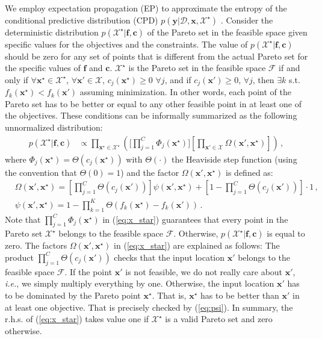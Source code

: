\documentclass[review,preprint,12pt]{elsarticle}
\begin{document}
We employ expectation propagation (EP) to approximate the entropy of the 
conditional predictive distribution (CPD) $p(\textbf{y}|\mathcal{D}, \textbf{x}, \mathcal{X}^{\star})$ 
\citep{minka2001expectation}. Consider the deterministic distribution 
$p(\mathcal{X}^{\star}|\textbf{f},\textbf{c})$ of the Pareto set 
in the feasible space given specific values for the objectives and the constraints. 
The value of $p(\mathcal{X}^{\star}|\textbf{f},\textbf{c})$ should be zero for 
any set of points that is different from the actual Pareto set for the specific values of 
$\mathbf{f}$ and $\mathbf{c}$.  $\mathcal{X}^{\star}$ is the Pareto set in the feasible space $\mathcal{F}$ if and only if 
$\forall \mathbf{x}^{\star} \in \mathcal{X}^{\star}$, $\forall \textbf{x}'\in\mathcal{X}$, $c_j(\mathbf{x}^\star) \geq 0$ 
$\forall j$, and if $c_j(\textbf{x}') \geq 0$, $\forall j$, then 
$\exists k$ s.t. $f_k(\mathbf{x}^{\star}) < f_k(\textbf{x}')$ assuming minimization. 
In other words, each point of the Pareto set has to be better or equal to any 
other feasible point in at least one of the objectives. 
These conditions can be informally summarized as the following unnormalized distribution:
\begin{align}
p(\mathcal{X}^{\star}|\textbf{f},\textbf{c}) & \propto 
	\prod_{\textbf{x}^\star\in \mathcal{X}^\star} 
	\left(
	\Bigg[\prod_{j=1}^{C}\Phi_j(\textbf{x}^{\star})\Bigg]
	\left[ 
	\prod_{\textbf{x}'\in \mathcal{X}} 
	\Omega(\textbf{x}',\textbf{x}^{\star})
	\right]	
	\right)
	\,,
	\label{eq:x_star}
\end{align}
where $\Phi_j(\mathbf{x}^\star) = \Theta(c_j(\mathbf{x}^\star))$ with
$\Theta(\cdot)$ the Heaviside step function (using the convention that $\Theta(0)=1$) 
and the factor $\Omega(\textbf{x}',\textbf{x}^{\star})$ is defined as:
\begin{align}
& \Omega(\textbf{x}',\textbf{x}^{\star})  = \left[\prod_{j=1}^{C}\Theta(c_j(\mathbf{x}'))\right] 
\psi(\textbf{x}',\textbf{x}^{\star}) + \left[1 - \prod_{j=1}^{C}\Theta(c_j(\textbf{x}')) \right] \cdot 1\,,\\
& \psi(\textbf{x}',\textbf{x}^{\star}) = 1 - \prod_{k=1}^K \Theta (f_k(\textbf{x}^{\star})-f_k(\textbf{x}'))\,.
\label{eq:psi}
\end{align}
Note that $\prod_{j=1}^{C}\Phi_j(\textbf{x}^{\star})$ in (\ref{eq:x_star}) guarantees that every 
point in the Pareto set $\mathcal{X}^\star$ belongs to the feasible space $\mathcal{F}$. 
Otherwise, $p(\mathcal{X}^\star |\mathbf{f},\mathbf{c})$ is equal to zero.
The factors $\Omega(\mathbf{x}',\mathbf{x}^\star)$ in (\ref{eq:x_star}) are explained as follows:
The product $\prod_{j=1}^{C}\Theta(c_j(\textbf{x}'))$ checks that the input location $\mathbf{x}'$
belongs to the feasible space $\mathcal{F}$. 
If the point $\mathbf{x}'$ is not feasible, we do not really care about $\mathbf{x}'$, \emph{i.e.}, we simply 
multiply everything by one. Otherwise, the input location $\mathbf{x}'$ has to be dominated by
the Pareto point $\mathbf{x}^\star$. That is, $\mathbf{x}^\star$ has to be better than 
$\mathbf{x}'$ in at least one objective. That is precisely checked by 
(\ref{eq:psi}).  In summary,  the r.h.s. of (\ref{eq:x_star}) takes value one if $\mathcal{X}^\star$ is a 
valid Pareto set and zero otherwise.
\end{document}
